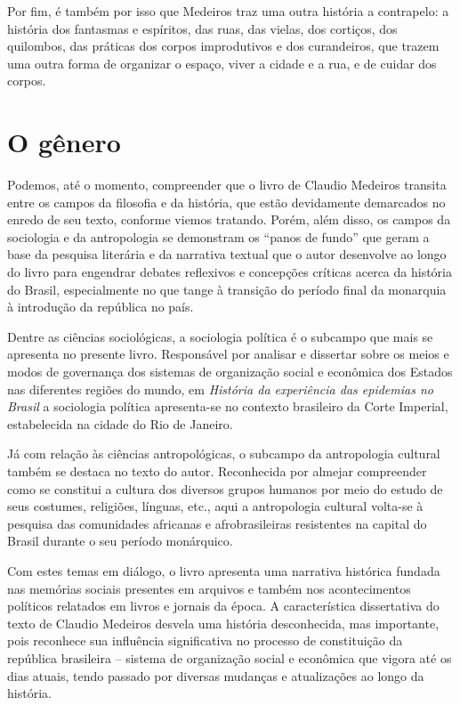 Por fim, é também por isso que Medeiros traz uma outra história a
contrapelo: a história dos fantasmas e espíritos, das ruas, das vielas,
dos cortiços, dos quilombos, das práticas dos corpos improdutivos e dos
curandeiros, que trazem uma outra forma de organizar o espaço, viver a
cidade e a rua, e de cuidar dos corpos.


\section{O gênero}\label{o-guxeanero}

Podemos, até o momento, compreender que o livro de Claudio Medeiros
transita entre os campos da filosofia e da história, que estão
devidamente demarcados no enredo de seu texto, conforme viemos tratando.
Porém, além disso, os campos da sociologia e da antropologia se
demonstram os ``panos de fundo'' que geram a base da pesquisa literária
e da narrativa textual que o autor desenvolve ao longo do livro para
engendrar debates reflexivos e concepções críticas acerca da história do
Brasil, especialmente no que tange à transição do período final da
monarquia à introdução da república no país.

Dentre as ciências sociológicas, a sociologia política é o subcampo que
mais se apresenta no presente livro. Responsável por analisar e
dissertar sobre os meios e modos de governança dos sistemas de
organização social e econômica dos Estados nas diferentes regiões do
mundo, em \emph{História da experiência das epidemias no Brasil} a
sociologia política apresenta-se no contexto brasileiro da Corte
Imperial, estabelecida na cidade do Rio de Janeiro.

Já com relação às ciências antropológicas, o subcampo da antropologia
cultural também se destaca no texto do autor. Reconhecida por almejar
compreender como se constitui a cultura dos diversos grupos humanos por
meio do estudo de seus costumes, religiões, línguas, etc., aqui a
antropologia cultural volta-se à pesquisa das comunidades africanas e
afrobrasileiras resistentes na capital do Brasil durante o seu período
monárquico.

Com estes temas em diálogo, o livro apresenta uma narrativa histórica
fundada nas memórias sociais presentes em arquivos e também nos
acontecimentos políticos relatados em livros e jornais da época. A
característica dissertativa do texto de Claudio Medeiros desvela uma
história desconhecida, mas importante, pois reconhece sua influência
significativa no processo de constituição da república brasileira --
sistema de organização social e econômica que vigora até os dias atuais,
tendo passado por diversas mudanças e atualizações ao longo da história.

